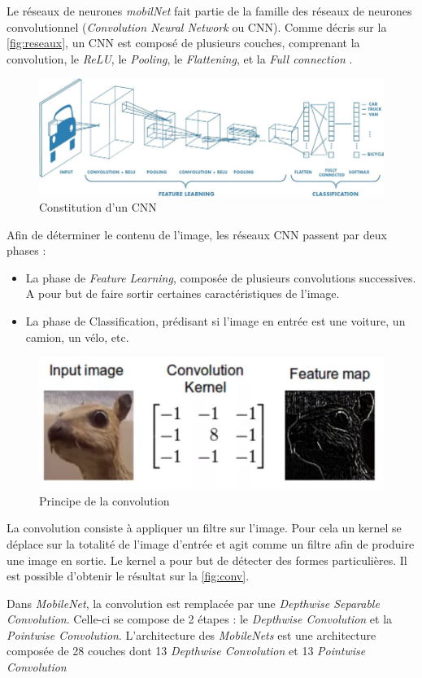 Le réseaux de neurones \textit{mobilNet} fait partie de la famille des réseaux de neurones convolutionnel (\textit{Convolution Neural Network} ou CNN). 
Comme décris sur la \autoref{fig:reseaux}, un CNN est composé de plusieurs couches, comprenant la convolution, le \textit{ReLU}, le \textit{Pooling}, le \textit{Flattening}, et la \textit{Full connection} \cite{noauthor_cs_nodate}.
\begin{figure}[ht!]
    \centering
    \includegraphics[width=0.6\linewidth]{Rapport/images/CNN.png}
    \caption{Constitution d'un CNN}
    \label{fig:cnn}
\end{figure}
Afin de déterminer le contenu de l’image, les réseaux CNN passent par deux phases :
\begin{itemize}
    \item La phase de \textit{Feature Learning}, composée de plusieurs convolutions successives. A pour but de faire sortir certaines caractéristiques de l’image.
    \item La phase de Classification, prédisant si l’image en entrée est une voiture, un camion, un vélo, etc.
\end{itemize}

\begin{figure}[ht!]
    \centering
    \includegraphics[width=0.6\linewidth]{Rapport/images/conv.png}
    \caption{Principe de la convolution}
    \label{fig:conv}
\end{figure}
La convolution consiste à appliquer un filtre sur l’image. Pour cela un kernel se déplace sur la totalité de l’image d’entrée et agit comme un filtre afin de produire une image en sortie. Le kernel a pour but de détecter des formes particulières. Il est possible d'obtenir le résultat sur la \autoref{fig:conv}.

Dans \textit{MobileNet}, la convolution est remplacée par une \textit{Depthwise Separable Convolution}. Celle-ci se compose de 2 étapes : le \textit{Depthwise Convolution} et la \textit{Pointwise Convolution}. 
L’architecture des \textit{MobileNets} est une architecture composée de 28 couches dont 13 \textit{Depthwise Convolution} et 13 \textit{Pointwise Convolution} 

